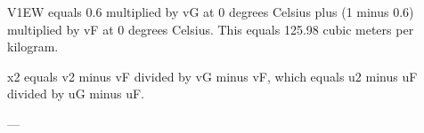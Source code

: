 V1EW equals 0.6 multiplied by vG at 0 degrees Celsius plus (1 minus 0.6) multiplied by vF at 0 degrees Celsius. This equals 125.98 cubic meters per kilogram.  

x2 equals v2 minus vF divided by vG minus vF, which equals u2 minus uF divided by uG minus uF.  

---